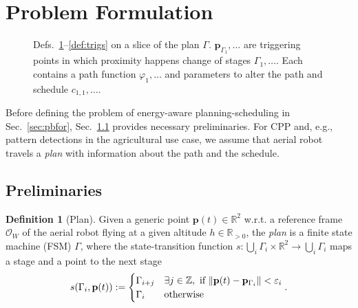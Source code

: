 \documentclass[letterpaper,10pt,journal,twoside]{IEEEtran}
\newcommand{\figpath}{./figures}
\DeclarePairedDelimiter\norm{\lVert}{\rVert}%
\theoremstyle{definition}
\newtheorem{defn}{Definition}[section]
\begin{document}
\section{Problem Formulation}  %
\label{sec:prob}               %
\begin{figure}[t]
  \footnotesize
  \begin{minipage}[l]{0.35\columnwidth}
    \caption{Defs.~\ref{def:plan}--\ref{def:trigs} on a slice of the plan $\Gamma$. $\mathbf{p}_{\Gamma_1},\dots$ are triggering points in which proximity happens change of stages $\Gamma_1,\dots$. Each contains a path function $\varphi_1,\dots$ and parameters to alter the path and schedule $c_{1,1},\dots$.}
    \label{fig:traj1}
  \end{minipage}\hfill
  \begin{minipage}[c]{0.6\columnwidth}
    \centering
    \vspace*{-4.5ex}
    
  \end{minipage}
  \vspace*{-4.5ex}
\end{figure}

Before defining the problem of energy-aware planning-scheduling in Sec.~\ref{sec:pbfor}, Sec.~\ref{sec:prelim} provides necessary preliminaries. For CPP and, e.g., pattern detections in the agricultural use case, we assume that aerial robot travels a \emph{plan} with information about the path and the schedule.

\vspace*{-2ex}
\subsection{Preliminaries}
\label{sec:prelim}

\begin{defn}[Plan]\label{def:plan}
  Given a generic point $\mathbf{p}(t)\in\mathbb{R}^2$ w.r.t. a reference frame $\mathcal{O}_W$ of the aerial robot flying at a given altitude $h\in\mathbb{R}_{>0}$, the \emph{plan} is a finite state machine (FSM) $\Gamma$, where the state-transition function $s:\bigcup_i{\Gamma_i}\times\mathbb{R}^2\rightarrow\bigcup_i{\Gamma_i}$ maps a stage and a point to the next stage
  \begin{equation*}s(\Gamma_i,\mathbf{p}(t)):=\begin{cases}
    \Gamma_{i+j} & \exists j\in\mathbb{Z},\text{ if }\norm{\mathbf{p}(t)-\mathbf{p}_{\Gamma_i}}<\varepsilon_i\\
    \Gamma_i & \text{otherwise}
  \end{cases}.\end{equation*}
\end{defn}
\end{document}
